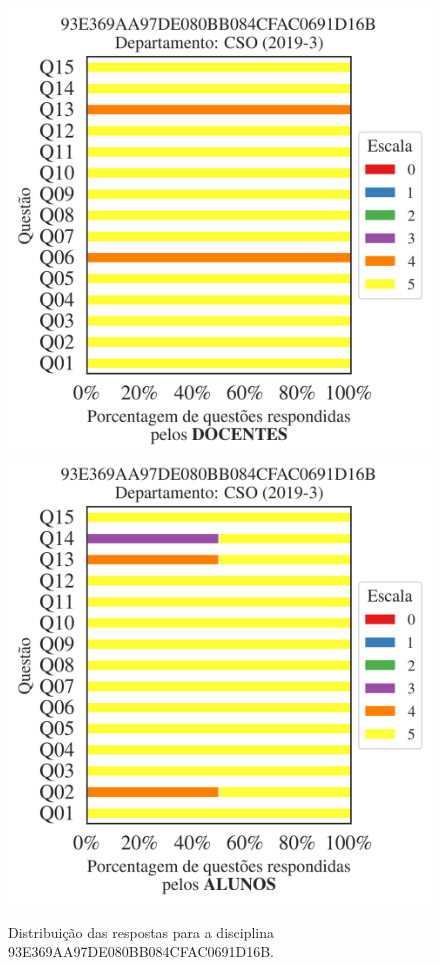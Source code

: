 \documentclass[a4paper,10pt]{article}
\begin{document}
\begin{figure}[h]
\centering
\includegraphics[width=0.485\linewidth]{analise_disciplina_departamento_CSO_93E369AA97DE080BB084CFAC0691D16B_docentes.png}
\includegraphics[width=0.485\linewidth]{analise_disciplina_departamento_CSO_93E369AA97DE080BB084CFAC0691D16B_alunos.png}
\caption{\label{fig:analise_geral_departamento}                Distribuição das respostas para a disciplina 93E369AA97DE080BB084CFAC0691D16B. }
\end{figure}
\end{document}

